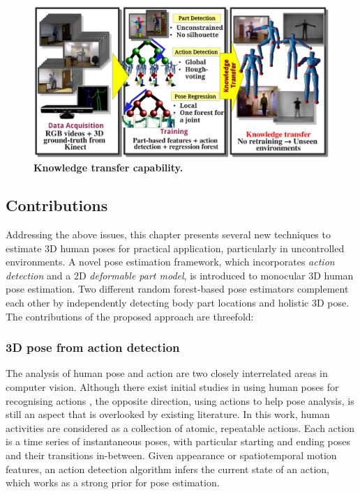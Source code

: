\begin{figure}[th]
	\centering
	\includegraphics[width=1\linewidth]{fig/body/figure2_transferexplain.pdf}
	\caption{\textbf{Knowledge transfer capability.}} 
	\label{fig/body/transferexplain}
\end{figure}



\subsection{Contributions}

Addressing the above issues, this chapter presents several new techniques to estimate 3D human poses for practical application, particularly in uncontrolled environments. 
A novel pose estimation framework, which incorporates \emph{action detection} and a 2D \emph{deformable part model}, is introduced to monocular 3D human pose estimation. 
Two different random forest-based pose estimators complement each other by independently detecting body part locations and holistic 3D pose. The contributions of the proposed approach are threefold:  

\subsubsection{3D pose from action detection} 

The analysis of human pose and action are two closely interrelated areas in computer vision. Although there exist initial studies in using human poses for recognising actions \cite{Yao2012, Wang2012}, the opposite direction, \ie using actions to help pose analysis, 
is still an aspect that is overlooked by existing literature. 
In this work, human activities are considered as a collection of atomic, repeatable actions. 
Each action is a time series of instantaneous poses, with particular starting and ending poses and their transitions in-between. Given appearance or spatiotemporal motion features, an action detection algorithm infers the current state of an action, which works as a strong prior for pose estimation.   

